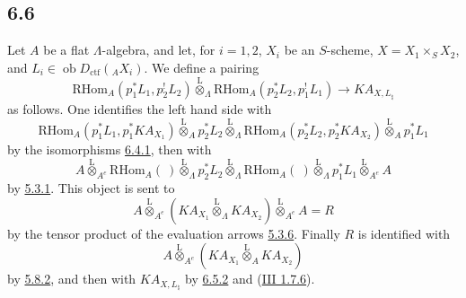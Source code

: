 \documentclass[11pt]{article}
\providecommand{\RHom}{\mathrm{RHom}}
\providecommand{\lten}{\overset{\mathrm L}{\otimes}}
\providecommand{\Ob}{\operatorname{ob}}
\providecommand{\RHom}{\mathrm{RHom}}
\providecommand{\lten}{\overset{\mathrm L}{\otimes}}
\providecommand{\RHom}{\mathrm R\mathcal{H}om}
\providecommand{\lten}{\overset{\mathrm L}{\otimes}}
\providecommand{\Ob}{\operatorname{ob}}
\providecommand{\lten}{\overset{\mathrm L}{\otimes}}
\providecommand{\lten}{\overset{\mathrm L}{\otimes}}
\providecommand{\Ob}{\operatorname{Ob}}
\providecommand{\lten}{\overset{\mathrm L}{\otimes}}
\providecommand{\RHom}{\mathrm{RHom}}
\providecommand{\Ob}{\operatorname{ob}}
\providecommand{\Ob}{\operatorname{Ob}}
\providecommand{\lten}{\overset{\mathrm L}{\otimes}}
\begin{document}
\subsection*{6.6}\label{sga5:IIIB:subsection:6.6}
Let $A$ be a flat $\Lambda$-algebra, and let, for $i=1,2$, $X_i$ be an $S$-scheme, $X=X_1\times_SX_2$, and $L_i\in\Ob D_{\mathrm{ctf}}({}_AX_i)$. We define a pairing
\begin{equation}
\RHom_A(p_1^*L_1,p_2^!L_2)
\lten_{\Lambda}
\RHom_A(p_2^*L_2,p_1^!L_1)
\longrightarrow
KA_{X,L_{\natural}}
\tag{6.6.1}\label{sga5:IIIB:equation:6.6.1}
\end{equation}
as follows. One identifies the left hand side with
\[
\RHom_A(p_1^*L_1,p_1^*KA_{X_1})
\lten_A p_2^*L_2
\lten_{\Lambda}
\RHom_A(p_2^*L_2,p_2^*KA_{X_2})
\lten_A p_1^*L_1
\]
by the isomorphisms \hyperref[sga5:IIIB:equation:6.4.1]{6.4.1}, then with
\[
A\lten_{A^e}\RHom_A(\ )\lten_{\Lambda}p_2^*L_2
 \lten_{\Lambda}\RHom_A(\ )\lten_{\Lambda}p_1^*L_1\lten_{A^e}A
\]
by \hyperref[sga5:IIIB:equation:5.3.1]{5.3.1}. This object is sent to
\[
A\lten_{A^e}(KA_{X_1}\lten_{\Lambda}KA_{X_2})\lten_{A^e}A=R
\]
by the tensor product of the evaluation arrows \hyperref[sga5:IIIB:equation:5.3.6]{5.3.6}. Finally $R$ is identified with
\[
A\lten_{A^e}(KA_{X_1}\lten_AKA_{X_2})
\]
by \hyperref[sga5:IIIB:equation:5.8.2]{5.8.2}, and then with $KA_{X,L_{\natural}}$ by \hyperref[sga5:IIIB:equation:6.5.2]{6.5.2} and (\hyperref[sga5:III:equation:1.7.6]{III 1.7.6}).
\end{document}
